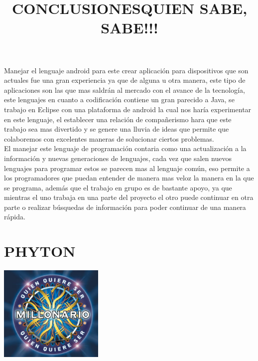 \documentclass[12pt]{extbook}
\begin{document}
\begin{center}
\title{CONCLUSIONES}\maketitle
\end{center}

Manejar el lenguaje android para este crear aplicación para dispositivos
que son actuales fue una gran experiencia ya que de alguna u otra
manera, este tipo de aplicaciones son las que mas saldrán al mercado
con el avance de la tecnología, este lenguajes en cuanto a codificación
contiene un gran parecido a Java, se trabajo en Eclipse con una plataforma
de android la cual nos haría experimentar en este lenguaje, el establecer
una relación de compañerismo hara que este trabajo sea mas divertido
y se genere una lluvia de ideas que permite que colaboremos con excelentes
maneras de solucionar ciertos problemas.\\

El manejar este lenguaje de programación contaria como una actualización
a la información y nuevas generaciones de lenguajes, cada vez que
salen nuevos lenguajes para programar estos se parecen mas al lenguaje
común, eso permite a los programadores que puedan entender de manera
mas veloz la manera en la que se programa, además que el trabajo en
grupo es de bastante apoyo, ya que mientras el uno trabaja en una
parte del proyecto el otro puede continuar en otra parte o realizar
búsquedas de información para poder continuar de una manera rápida. 

\chapter{PHYTON}
\begin{center}
\title{\Large{QUIEN SABE, SABE!!!}}\maketitle
\end{center}

\begin{center}
\includegraphics[width=5cm]{quienquieresermillonario.jpg}
\end{center}
\end{document}
